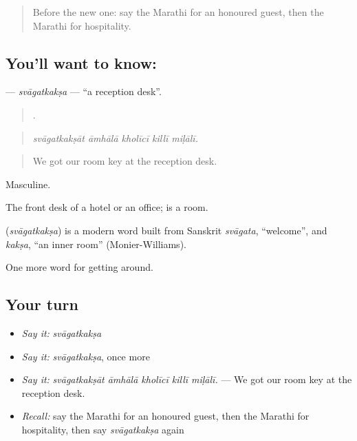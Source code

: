 \label{lesson:MR-C414-svagatkaksa}



\begin{quote}
Before the new one: say the Marathi for an honoured guest, then the Marathi for hospitality.
\end{quote}

\subsection*{You'll want to know: }
\textbf{} — \emph{svāgatkakṣa} — \textquotedblleft{}a reception desk\textquotedblright{}.

\begin{quote}
    .
\end{quote}

\begin{quote}
\emph{svāgatkakṣāt āmhālā kholīcī killī miḷālī.}
\end{quote}

\begin{quote}
We got our room key at the reception desk.
\end{quote}

Masculine.

The front desk of a hotel or an office;  is a room.

\begin{cousinweb}
\textbf{} (\emph{svāgatkakṣa}) is a modern word built from Sanskrit \emph{svāgata}, \textquotedblleft{}welcome\textquotedblright{}, and \emph{kakṣa}, \textquotedblleft{}an inner room\textquotedblright{} (Monier-Williams).
\end{cousinweb}

\begin{grammarlens}[title={What you've built}]
One more word for getting around.
\end{grammarlens}

\subsection*{Your turn}
\begin{itemize}
\raggedright
  \item \emph{Say it:} \emph{svāgatkakṣa}
  \item \emph{Say it:} \emph{svāgatkakṣa}, once more
  \item \emph{Say it:} \emph{svāgatkakṣāt āmhālā kholīcī killī miḷālī.} — We got our room key at the reception desk.
  \item \emph{Recall:} say the Marathi for an honoured guest, then the Marathi for hospitality, then say \emph{svāgatkakṣa} again
\end{itemize}

